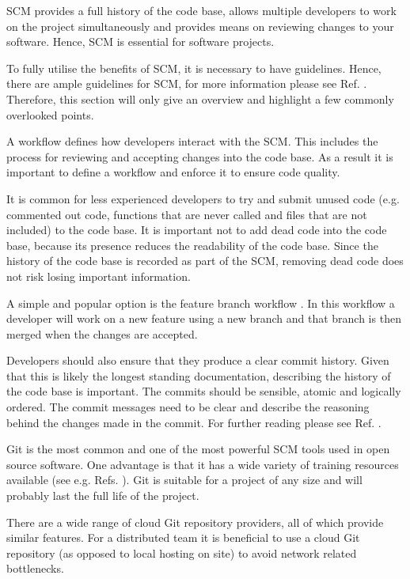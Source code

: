 \documentclass[jnr]{iosart2x}
\begin{document}
SCM provides a full history of the code base, allows multiple developers to work on the project simultaneously and provides means on reviewing changes to your software.
Hence, SCM is essential for software projects.

To fully utilise the benefits of SCM, it is necessary to have guidelines.
Hence, there are ample guidelines for SCM, for more information please see Ref. \cite{awesome-git}.
Therefore, this section will only give an overview and highlight a few commonly overlooked points.

A workflow defines how developers interact with the SCM.
This includes the process for reviewing and accepting changes into the code base.
As a result it is important to define a workflow and enforce it to ensure code quality.

It is common for less experienced developers to try and submit unused code (e.g. commented out code, functions that are never called and files that are not included) to the code base.
It is important not to add dead code into the code base, because
its presence reduces the readability of the code base.
Since the history of the code base is recorded as part of the SCM, removing dead code does not risk losing important information.

A simple and popular option is the feature branch workflow \cite{feature-branch}.
In this workflow a developer will work on a new feature using a new branch and that branch is then merged when the changes are accepted.

Developers should also ensure that they produce a clear commit history.
Given that this is likely the longest standing documentation, describing the history of the code base is important.
The commits should be sensible, atomic and logically ordered.
The commit messages need to be clear and describe the reasoning behind the changes made in the commit.
For further reading please see Ref. \cite{git-commit}.

Git \cite{Git} is the most common and one of the most powerful SCM tools used in open source software.
One advantage is that it has a wide variety of training resources available (see e.g. Refs. \cite{github-git, atlassian-git, codecademy-git}).
Git is suitable for a project of any size and will probably last the full life of the project.

There are a wide range of cloud Git repository providers, all of which provide similar features.
For a distributed team it is beneficial to use a cloud Git repository (as opposed to local hosting on site) to avoid network related bottlenecks.
\end{document}
